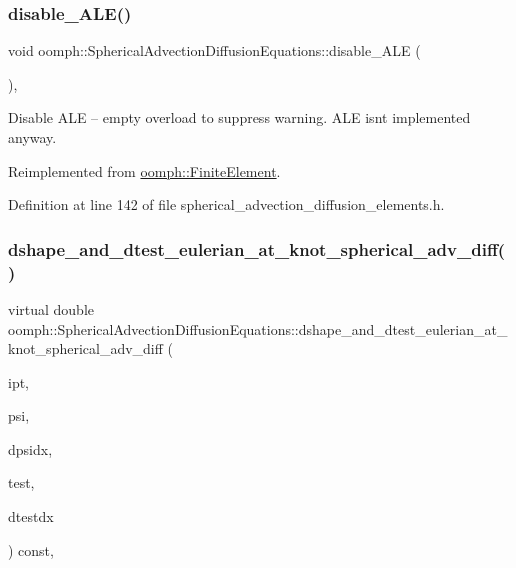 \subsubsection{\texorpdfstring{disable\+\_\+\+A\+L\+E()}{disable\_ALE()}}
{\footnotesize\ttfamily void oomph\+::\+Spherical\+Advection\+Diffusion\+Equations\+::disable\+\_\+\+A\+LE (\begin{DoxyParamCaption}{ }\end{DoxyParamCaption})\hspace{0.3cm}{\ttfamily [inline]}, {\ttfamily [virtual]}}



Disable A\+LE -- empty overload to suppress warning. A\+LE isn\textquotesingle{}t implemented anyway. 



Reimplemented from \hyperlink{classoomph_1_1FiniteElement_a625ea6d3f9baccfbdd1323315fb3ec71}{oomph\+::\+Finite\+Element}.



Definition at line 142 of file spherical\+\_\+advection\+\_\+diffusion\+\_\+elements.\+h.

\mbox{\label{classoomph_1_1SphericalAdvectionDiffusionEquations_a2b61d50b166871a64507ee13b8e94f54}} 
\subsubsection{\texorpdfstring{dshape\+\_\+and\+\_\+dtest\+\_\+eulerian\+\_\+at\+\_\+knot\+\_\+spherical\+\_\+adv\+\_\+diff()}{dshape\_and\_dtest\_eulerian\_at\_knot\_spherical\_adv\_diff()}}
{\footnotesize\ttfamily virtual double oomph\+::\+Spherical\+Advection\+Diffusion\+Equations\+::dshape\+\_\+and\+\_\+dtest\+\_\+eulerian\+\_\+at\+\_\+knot\+\_\+spherical\+\_\+adv\+\_\+diff (\begin{DoxyParamCaption}\item[{const unsigned \&}]{ipt,  }\item[{\hyperlink{classoomph_1_1Shape}{Shape} \&}]{psi,  }\item[{\hyperlink{classoomph_1_1DShape}{D\+Shape} \&}]{dpsidx,  }\item[{\hyperlink{classoomph_1_1Shape}{Shape} \&}]{test,  }\item[{\hyperlink{classoomph_1_1DShape}{D\+Shape} \&}]{dtestdx }\end{DoxyParamCaption}) const\hspace{0.3cm}{\ttfamily [protected]}, {}}



